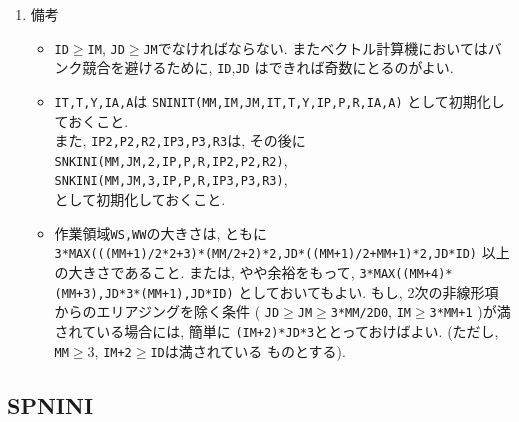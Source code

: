 \documentclass[a4j,fleqn]{jarticle}
\begin{document}
\begin{enumerate}
\item 備考

\begin{itemize}

\item {\tt ID}$\ge${\tt IM}, {\tt JD}$\ge${\tt JM}でなければならない.
   またベクトル計算機においてはバンク競合を避けるために, {\tt ID},{\tt JD}
   はできれば奇数にとるのがよい.

\item {\tt IT,T,Y,IA,A}は 
      {\tt SNINIT(MM,IM,JM,IT,T,Y,IP,P,R,IA,A)} として初期化しておくこと.\\
       また, {\tt IP2,P2,R2,IP3,P3,R3}は, その後に\\
      {\tt SNKINI(MM,JM,2,IP,P,R,IP2,P2,R2)},
      {\tt SNKINI(MM,JM,3,IP,P,R,IP3,P3,R3)}, \\
      として初期化しておくこと.

\item 作業領域{\tt WS,WW}の大きさは, ともに\\
     {\tt 3*MAX(((MM+1)/2*2+3)*(MM/2+2)*2,JD*((MM+1)/2+MM+1)*2,JD*ID)}
    以上の大きさであること. または, やや余裕をもって,
     {\tt 3*MAX((MM+4)*(MM+3),JD*3*(MM+1),JD*ID)}
    としておいてもよい. もし, 2次の非線形項からのエリアジングを除く条件
     ( {\tt JD}$\ge${\tt JM}$\ge${\tt 3*MM/2D0}, 
      {\tt IM}$\ge${\tt 3*MM+1} )が満されている場合には, 簡単に
      {\tt (IM+2)*JD*3}ととっておけばよい.
     (ただし, {\tt MM}$\ge 3$, {\tt IM+2}$\ge${\tt ID}は満されている
    ものとする).

 \end{itemize}

\end{enumerate}

\subsection{SPNINI}
\end{document}
